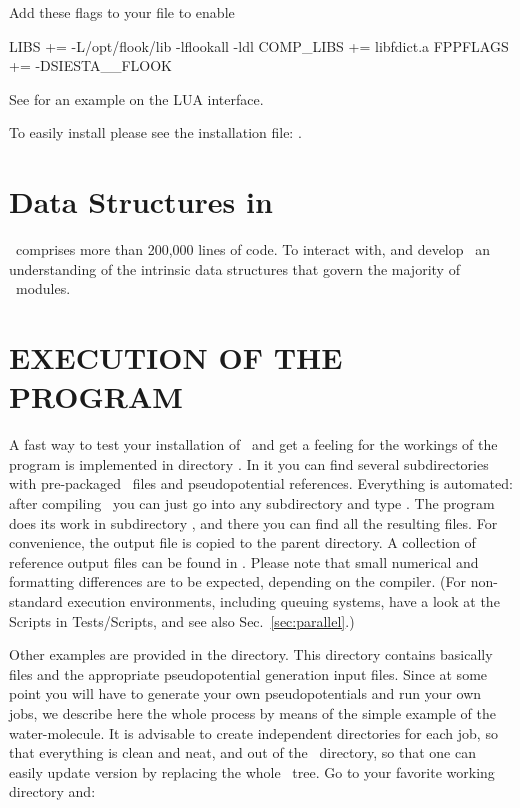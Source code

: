 \begin{description}
  Add these flags to your  file to enable 
\begin{shellexample}
  LIBS += -L/opt/flook/lib -lflookall -ldl
  COMP_LIBS += libfdict.a
  FPPFLAGS += -DSIESTA__FLOOK
\end{shellexample}
  
  See  for an example on the LUA interface.

  To easily install  please see the installation file:
  .

\end{description}


\ifdeveloper
\section{Data Structures in \texorpdfstring{\siesta}{siesta}}

\siesta\ comprises more than 200,000 lines of code. To interact with,
and develop \siesta\ an understanding of the intrinsic data structures
that govern the majority of \siesta\ modules.

\fi


\section{EXECUTION OF THE PROGRAM}

A fast way to test your installation of \siesta\ and get a feeling for
the workings of the program is implemented in directory
. In it you can find several subdirectories
with pre-packaged \fdflib\ files and pseudopotential references. Everything
is automated: after compiling \siesta\ you can just go into any
subdirectory and type . The program does its work in
subdirectory , and there you can find all the resulting
files. For convenience, the output file is copied to the parent
directory. A collection of reference output files can be found in
. Please note that small numerical and
formatting differences are to be expected, depending on the compiler.
(For non-standard execution environments, including queuing systems,
have a look at the Scripts in Tests/Scripts, and see also
Sec.~\ref{sec:parallel}.)

Other examples are provided in the  directory. This
directory contains basically  files and the appropriate
pseudopotential generation input files. Since at some point you will
have to generate your own pseudopotentials and run your own jobs, we
describe here the whole process by means of the simple example of the
water-molecule. It is advisable to create independent directories for
each job, so that everything is clean and neat, and out of the
\siesta\ directory, so that one can easily update version by replacing
the whole \siesta\ tree. Go to your favorite working directory and:

